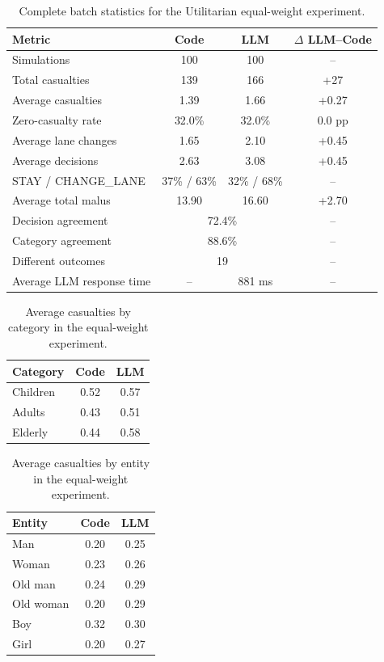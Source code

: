 \documentclass[10pt,a4paper]{article}
\begin{document}
\begin{table}[H]
\centering
\small
\begin{tabular}{lccc}
\toprule
Metric & Code & LLM & $\Delta$ LLM--Code \\
\midrule
Simulations & 100 & 100 & -- \\
Total casualties & 139 & 166 & +27 \\
Average casualties & 1.39 & 1.66 & +0.27 \\
Zero-casualty rate & 32.0\% & 32.0\% & 0.0 pp \\
Average lane changes & 1.65 & 2.10 & +0.45 \\
Average decisions & 2.63 & 3.08 & +0.45 \\
STAY / CHANGE\_LANE & 37\% / 63\% & 32\% / 68\% & -- \\
Average total malus & 13.90 & 16.60 & +2.70 \\
Decision agreement & \multicolumn{2}{c}{72.4\%} & -- \\
Category agreement & \multicolumn{2}{c}{88.6\%} & -- \\
Different outcomes & \multicolumn{2}{c}{19} & -- \\
Average LLM response time & -- & 881 ms & -- \\
\bottomrule
\end{tabular}
\caption{Complete batch statistics for the Utilitarian equal-weight experiment.}
\label{tab:app-utilitarian-equal}
\end{table}

\begin{table}[H]
\centering
\small
\begin{tabular}{lcc}
\toprule
Category & Code & LLM \\
\midrule
Children & 0.52 & 0.57 \\
Adults   & 0.43 & 0.51 \\
Elderly  & 0.44 & 0.58 \\
\bottomrule
\end{tabular}
\caption{Average casualties by category in the equal-weight experiment.}
\label{tab:app-utilitarian-equal-categories}
\end{table}

\begin{table}[H]
\centering
\small
\begin{tabular}{lcc}
\toprule
Entity & Code & LLM \\
\midrule
Man       & 0.20 & 0.25 \\
Woman     & 0.23 & 0.26 \\
Old man   & 0.24 & 0.29 \\
Old woman & 0.20 & 0.29 \\
Boy       & 0.32 & 0.30 \\
Girl      & 0.20 & 0.27 \\
\bottomrule
\end{tabular}
\caption{Average casualties by entity in the equal-weight experiment.}
\label{tab:app-utilitarian-equal-entities}
\end{table}
\end{document}
